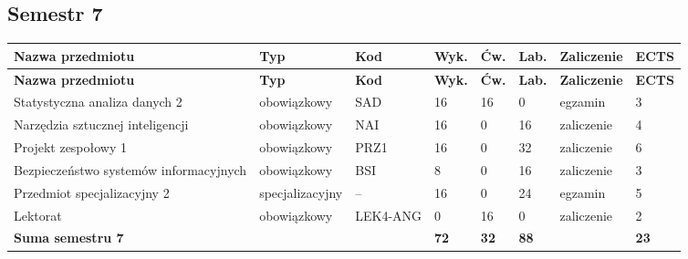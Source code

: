 \documentclass[12pt,a4paper]{article}
\newcommand{\thdrule}{\noalign{\global\setlength{\extrarowheight}{0pt}}}
\newcommand{\thdend}{\noalign{\global\setlength{\extrarowheight}{4pt}}}
\begin{document}
\clearpage
\subsection*{Semestr 7}

{\scriptsize
\begin{longtable}{>{\RaggedRight}m{5.0cm}m{1.9cm}m{0.75cm}m{0.85cm}m{0.85cm}m{0.85cm}m{1.45cm}m{0.9cm}}
\thdrule\toprule
\rowcolor{pjatkRed}
{\color{white}\footnotesize\textbf{\vphantom{Ag}Nazwa przedmiotu}} & {\color{white}\footnotesize\textbf{\vphantom{Ag}Typ}} & {\color{white}\footnotesize\textbf{\vphantom{Ag}Kod}} & {\color{white}\footnotesize\textbf{\vphantom{Ag}Wyk.}} & {\color{white}\footnotesize\textbf{\vphantom{Ag}Ćw.}} & {\color{white}\footnotesize\textbf{\vphantom{Ag}Lab.}} & {\color{white}\footnotesize\textbf{\vphantom{Ag}Zaliczenie}} & {\color{white}\footnotesize\textbf{\vphantom{Ag}ECTS}} \\
\midrule\thdend
\endfirsthead
\thdrule\toprule
\rowcolor{pjatkRed}
{\color{white}\footnotesize\textbf{\vphantom{Ag}Nazwa przedmiotu}} & {\color{white}\footnotesize\textbf{\vphantom{Ag}Typ}} & {\color{white}\footnotesize\textbf{\vphantom{Ag}Kod}} & {\color{white}\footnotesize\textbf{\vphantom{Ag}Wyk.}} & {\color{white}\footnotesize\textbf{\vphantom{Ag}Ćw.}} & {\color{white}\footnotesize\textbf{\vphantom{Ag}Lab.}} & {\color{white}\footnotesize\textbf{\vphantom{Ag}Zaliczenie}} & {\color{white}\footnotesize\textbf{\vphantom{Ag}ECTS}} \\
\midrule\thdend
\endhead
\rowcolor{tableRowLight} Statystyczna analiza danych 2 & {\scriptsize obowiązkowy} & SAD & 16 & 16 & 0 & {\scriptsize egzamin} & 3 \\
\rowcolor{tableRowAlt} Narzędzia sztucznej inteligencji & {\scriptsize obowiązkowy} & NAI & 16 & 0 & 16 & {\scriptsize zaliczenie} & 4 \\
\rowcolor{tableRowLight} Projekt zespołowy 1 & {\scriptsize obowiązkowy} & PRZ1 & 16 & 0 & 32 & {\scriptsize zaliczenie} & 6 \\
\rowcolor{tableRowAlt} Bezpieczeństwo systemów informacyjnych & {\scriptsize obowiązkowy} & BSI & 8 & 0 & 16 & {\scriptsize zaliczenie} & 3 \\
\rowcolor{tableElective} Przedmiot specjalizacyjny 2 & {\scriptsize specjalizacyjny} & -- & 16 & 0 & 24 & {\scriptsize egzamin} & 5 \\
\rowcolor{tableRowAlt} Lektorat & {\scriptsize obowiązkowy} & LEK4-ANG & 0 & 16 & 0 & {\scriptsize zaliczenie} & 2 \\
\midrule[\heavyrulewidth]
\rowcolor{tableSummary} \textbf{Suma semestru 7} & & & \textbf{72} & \textbf{32} & \textbf{88} & & \textbf{23} \\
\bottomrule
\end{longtable}}
\end{document}
